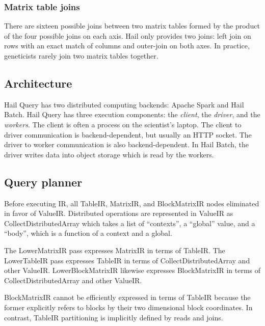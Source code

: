 \documentclass[10pt,a4paper%
]{article}
\begin{document}
\subsubsection{Matrix table joins}

There are sixteen possible joins between two matrix tables formed by the product of the four
possible joins on each axis. Hail only provides two joins: left join on rows with an exact match of
columns and outer-join on both axes. In practice, geneticists rarely join two matrix tables
together.

\subsection{Architecture}

Hail Query has two distributed computing backends: Apache Spark and Hail Batch. Hail Query has three
execution components: the \emph{client}, the \emph{driver}, and the \emph{workers}. The client is
often a process on the scientist's laptop. The client to driver communication is backend-dependent,
but usually an HTTP socket. The driver to worker communication is also backend-dependent. In Hail
Batch, the driver writes data into object storage which is read by the workers.

\subsection{Query planner}

Before executing IR, all TableIR, MatrixIR, and BlockMatrixIR nodes eliminated in favor of
ValueIR. Distributed operations are represented in ValueIR as CollectDistributedArray which takes a
list of ``contexts'', a ``global'' value, and a ``body'', which is a function of a context and a
global.

The LowerMatrixIR pass expresses MatrixIR in terms of TableIR. The LowerTableIR pass expresses
TableIR in terms of CollectDistributedArray and other ValueIR. LowerBlockMatrixIR likewise expresses
BlockMatrixIR in terms of CollectDistributedArray and other ValueIR.

BlockMatrixIR cannot be efficiently expressed in terms of TableIR because the former explicitly
refers to blocks by their two dimensional block coordinates. In contrast, TableIR partitioning is
implicitly defined by reads and joins.


\end{document}
